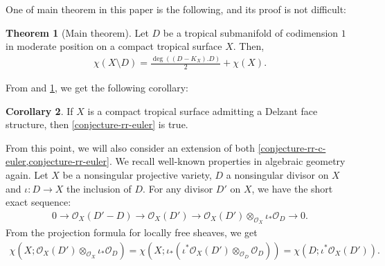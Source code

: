 \documentclass[a4paper,dvipdfmx,reqno,12pt]{amsart}
\theoremstyle{definition}
\newtheorem{theorem}{Theorem}[section]
\newtheorem{corollary}[theorem]{Corollary}
\newcommand{\opn}[1]{\operatorname{#1}}
\numberwithin{equation}{section}
\begin{document}
One of main theorem in this paper
is the following, and its proof is not difficult:
\begin{theorem}[{Main theorem}]
\label{theorem-rr-euler-surface}
Let $D$ be a tropical submanifold of codimension $1$
in moderate position on a compact tropical surface
$X$. Then,
\begin{align}
\chi(X\setminus D)=\frac{\opn{deg}((D-K_X).D)}{2}+
\chi(X).
\end{align}
\end{theorem}
From \cite[Theorem 6.3]{demedrano2023chern}
and \cref{theorem-rr-euler-surface}, we get
the following corollary:
\begin{corollary}
\label{corollary-ds-euler-rr}
If $X$ is a compact tropical surface admitting 
a Delzant face structure, then
\cref{conjecture-rr-euler} is true.
\end{corollary}
From this point, 
we will also consider an extension of both
\cref{conjecture-rr-c-euler,conjecture-rr-euler}.
We recall well-known properties in algebraic geometry again.
Let $X$ be a nonsingular projective variety,
$D$ a nonsingular divisor on $X$ and
$\iota\colon D\to X$ the inclusion of $D$.
For any divisor $D'$ on $X$, we have
the short exact sequence:
\begin{align}
0 \to \mathcal{O}_X(D'-D)\to \mathcal{O}_X(D')
\to \mathcal{O}_X(D')
\otimes_{\mathcal{O}_X} \iota_*\mathcal{O}_D \to 0. 
\end{align}
From the projection formula for locally free sheaves,
we get 
\begin{align}
\chi(X;\mathcal{O}_X(D')\otimes_{\mathcal{O}_X} \iota_*\mathcal{O}_D)
=\chi(X;\iota_*(\iota^{*}\mathcal{O}_X(D')\otimes_{\mathcal{O}_D} \mathcal{O}_D))
=\chi(D;\iota^{*}\mathcal{O}_X(D')).
\end{align}
\end{document}
